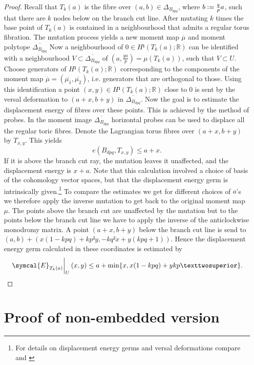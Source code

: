 \documentclass[12pt,a4paper,draft]{scrartcl}
\begin{document}
\begin{proof}
  Recall that $T_k(a)$ is the fibre over $(a,b) \in Δ_{B_{dpq}}$, where $b\vcentcolon=\frac{q}{p}a$, such that there are $k$ nodes below on the branch cut line.
  After mutating $k$ times the base point of $T_k(a)$ is contained in a neighbourhood that admits a regular torus fibration.
  The mutation process yields a new moment map $\overline{μ}$ and moment polytope $\overline{Δ_{B_{dpq}}}$
   Now a neighbourhood of $0 ∈ H¹(T_k(a);ℝ)$ can be identified with a neighbourhood $V ⊂ \overline{Δ_{B_{dpq}}}$ of $(a,\frac{qa}{p}) = μ(T_k(a))$, such that $V \subset U$.
  Choose generators of $H¹(T_k(a);ℝ)$ corresponding to the components of the moment map $\overline{\mu}=(\overline{\mu_1},\overline{\mu_2})$, i.e.
  generators that are orthogonal to those.
  Using this identification a point $(x,y) ∈ H¹(T_k(a);ℝ)$ close to $0$ is sent by the versal deformation to $(a + x, b + y)$ in $\overline{Δ_{B_{dpq}}}$.
  Now the goal is to estimate the displacement energy of fibres over these points.
  This is achieved by the method of probes.
  In the moment image $\overline{Δ_{B_{dpq}}}$ horizontal probes can be used to displace all the regular toric fibres.
  Denote the Lagrangian torus fibres over $(a + x, b + y)$ by $T_{x,y}$.
  This yields 
  \[ e(B_{dpq},T_{x,y})\leq a+x. \]
  If it is above the branch cut ray,  the mutation leaves it unaffected, and the displacement energy is $x+a$.
  Note that this calculation involved a choice of basis of the cohomology vector spaces, but that the displacement energy germ is intrinsically given.\footnote{For details on displacement energy germs and versal deformations compare \cite{chekanovschlenk2015} and \cite{brendel2020real}} To compare the estimates we get for different choices of $a$'s we therefore apply the inverse mutation to get back to the original moment map $\mu$.
  The points above the branch cut are unaffected by the mutation but to the points below the branch cut line we have to apply the inverse of the anticlockwise monodromy matrix.
   A point $(a + x, b + y)$ below the branch cut line is send to $(a,b) + (x(1-kpq)+kp²y, -kq²x + y(kpq +1))$.
  Hence the displacement energy germ calculated in these coordinates is estimated by 
  \[ \eval{\symcal{E}_{T_k(a)}}_U (x,y) \leq a+\min\{x,x(1-kpq)+ykp²\}. \]
\end{proof}


\section{Proof of non-embedded version}
\end{document}
